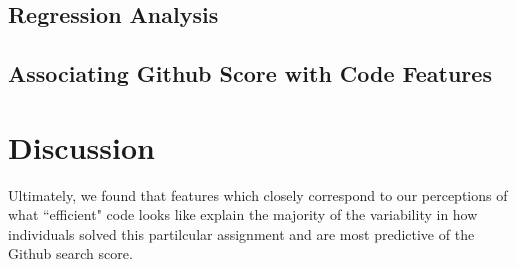 \documentclass[12pt]{article}\usepackage[]{graphicx}\usepackage[]{color}
\begin{document}
\subsection{Regression Analysis}




\subsection{Associating Github Score with Code Features}




\section{Discussion}
\label{discussion}

Ultimately, we found that features which closely correspond to our perceptions of what ``efficient" 
code looks like explain the majority of the variability in how individuals solved this partilcular assignment and 
are most predictive of the Github search score. 




% 
% 
% 
\end{document}
